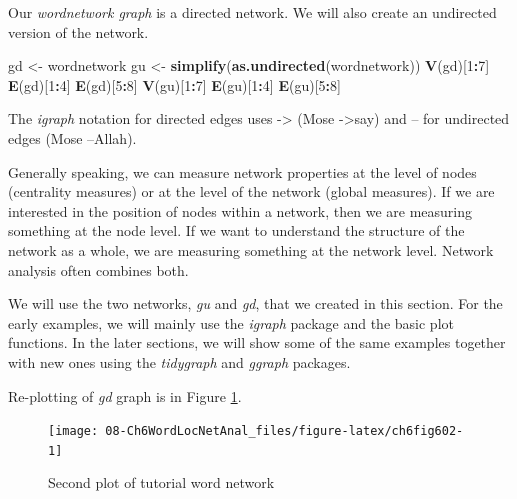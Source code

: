 \documentclass[
]{article}
\newenvironment{Shaded}{\begin{snugshade}}{\end{snugshade}}
\newcommand{\DecValTok}[1]{\textcolor[rgb]{0.00,0.00,0.81}{#1}}
\newcommand{\FunctionTok}[1]{\textcolor[rgb]{0.13,0.29,0.53}{\textbf{#1}}}
\newcommand{\NormalTok}[1]{#1}
\newcommand{\OtherTok}[1]{\textcolor[rgb]{0.56,0.35,0.01}{#1}}
\newcommand{\SpecialCharTok}[1]{\textcolor[rgb]{0.81,0.36,0.00}{\textbf{#1}}}
\begin{document}
Our \emph{wordnetwork graph} is a directed network. We will also create an undirected version of the network.

\scriptsize

\begin{Shaded}
\begin{Highlighting}[]
\NormalTok{gd }\OtherTok{\textless{}{-}}\NormalTok{ wordnetwork}
\NormalTok{gu }\OtherTok{\textless{}{-}} \FunctionTok{simplify}\NormalTok{(}\FunctionTok{as.undirected}\NormalTok{(wordnetwork))}
\FunctionTok{V}\NormalTok{(gd)[}\DecValTok{1}\SpecialCharTok{:}\DecValTok{7}\NormalTok{]}
\FunctionTok{E}\NormalTok{(gd)[}\DecValTok{1}\SpecialCharTok{:}\DecValTok{4}\NormalTok{]}
\FunctionTok{E}\NormalTok{(gd)[}\DecValTok{5}\SpecialCharTok{:}\DecValTok{8}\NormalTok{]}
\FunctionTok{V}\NormalTok{(gu)[}\DecValTok{1}\SpecialCharTok{:}\DecValTok{7}\NormalTok{]}
\FunctionTok{E}\NormalTok{(gu)[}\DecValTok{1}\SpecialCharTok{:}\DecValTok{4}\NormalTok{]}
\FunctionTok{E}\NormalTok{(gu)[}\DecValTok{5}\SpecialCharTok{:}\DecValTok{8}\NormalTok{]}
\end{Highlighting}
\end{Shaded}

\normalsize

The \emph{igraph} notation for directed edges uses -\textgreater{} (Mose -\textgreater say) and -- for undirected edges (Mose --Allah).

Generally speaking, we can measure network properties at the level of nodes (centrality measures) or at the level of the network (global measures). If we are interested in the position of nodes within a network, then we are measuring something at the node level. If we want to understand the structure of the network as a whole, we are measuring something at the network level. Network analysis often combines both.

We will use the two networks, \emph{gu} and \emph{gd}, that we created in this section. For the early examples, we will mainly use the \emph{igraph} package and the basic plot functions. In the later sections, we will show some of the same examples together with new ones using the \emph{tidygraph} and \emph{ggraph} packages.

Re-plotting of \emph{gd} graph is in Figure \ref{fig:ch6fig602}.

\begin{figure}

{\centering \texttt{[image: 08-Ch6WordLocNetAnal\_files/figure-latex/ch6fig602-1]} 

}

\caption{Second plot of tutorial word network}\label{fig:ch6fig602}
\end{figure}
\end{document}

